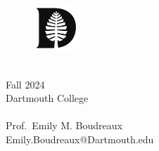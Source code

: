 
\vspace{-1in}
\noindent
\begin{figure}
\includegraphics[width=0.67in]{"../assets/D-Pine_Black-eps-converted-to"}
\end{figure}

 \\
Fall 2024 \\
Dartmouth College\\

\vspace{-70pt}
\flushright
\hspace{1in}\\
Prof.\ Emily M. Boudreaux \\
Emily.Boudreaux@Dartmouth.edu \\

\flushleft

\vspace{2ex}
